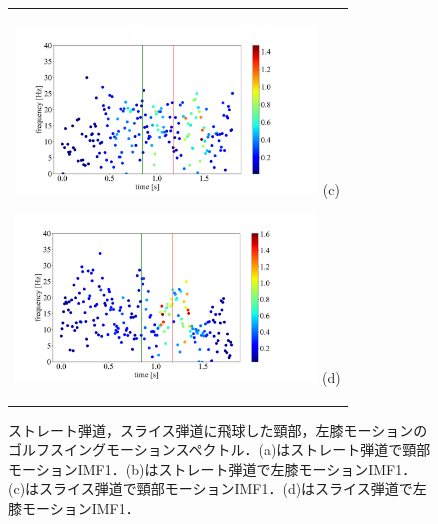 \begin{figure}
    \begin{center}
        \begin{tabular}{c}
            \begin{minipage}{0.5\hsize}
                \begin{center}
                    \includegraphics[width=8cm]{./images/straight_data/neck/IMF1.png}
                    (c)
                    \label{slice neck imf1}
                \end{center}
            \end{minipage}

            \begin{minipage}{0.5\hsize}
                \begin{center}
                    \includegraphics[width=8cm]{./images/straight_data/left_leg/IMF1.png}
                    (d)
                    \label{slice left leg imf1}
                \end{center}
            \end{minipage}
        \end{tabular}
    \end{center}
    \caption{ストレート弾道，スライス弾道に飛球した頸部，左膝モーションのゴルフスイングモーションスペクトル．(a)はストレート弾道で頸部モーションIMF1．(b)はストレート弾道で左膝モーションIMF1．(c)はスライス弾道で頸部モーションIMF1．(d)はスライス弾道で左膝モーションIMF1．}
    \label{imf1}
\end{figure}

